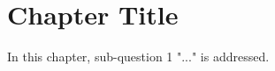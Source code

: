 \chapter{Chapter Title}
\label{ch3: first-core-chapter}
\minitoc

In this chapter, sub-question 1 "..." is addressed.